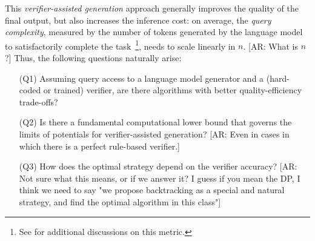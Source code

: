 \iffalse
This \emph{verifier-assisted generation} approach generally improves the quality of the final output,
but also increases the inference cost:
on average, the \emph{query complexity}, measured by the number of tokens generated by the language model to satisfactorily complete the task~\footnote{
See  for additional discussions on this metric.
}, needs to scale linearly in $n$. [AR: What is $n$?]
Thus, the following questions naturally arise: 
\begin{enumerate}%
\setlength\itemsep{-0.1ex}
    \item[(Q1)] Assuming query access to a language model generator and a (hard-coded or trained) verifier, 
    are there algorithms with better quality-efficiency trade-offs? 
    \item[(Q2)] Is there a fundamental computational lower bound that governs the limits of potentials for verifier-assisted generation? [AR: Even in cases in which there is a perfect rule-based verifier.]
    \item[(Q3)] How does the optimal strategy depend on the verifier accuracy? [AR: Not sure what this means, or if we answer it? I guess if you mean the DP, I think we need to say "we propose backtracking as a special and natural strategy, and find the optimal algorithm in this class"] 
\end{enumerate}

